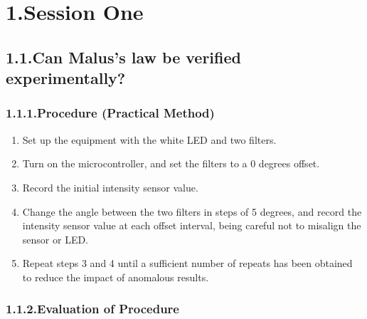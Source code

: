 \documentclass{article}
\begin{document}
\section{1.\hspace*{0.5em}Session One}\label{sec-session-one}%

\subsection{1.1.\hspace*{0.5em}Can Malus’s law be verified experimentally?}\label{sec-can-maluss-law-be-verified-experimentally}%

\subsubsection{1.1.1.\hspace*{0.5em}Procedure (Practical Method)}\label{sec-procedure-practical-method}%

\begin{enumerate}[noitemsep,topsep=\mdcompacttopsep]%

\item{}Set up the equipment with the white LED and two filters.%

\item{}Turn on the microcontroller, and set the filters to a 0 degrees offset.%

\item{}Record the initial intensity sensor value.%

\item{}Change the angle between the two filters in steps of 5 degrees, and record the intensity sensor value at each offset interval, being careful not to misalign the sensor or LED.%

\item{}Repeat steps 3 and 4 until a sufficient number of repeats has been obtained to reduce the impact of anomalous results.%
\end{enumerate}%

\subsubsection{1.1.2.\hspace*{0.5em}Evaluation of Procedure}\label{sec-evaluation-of-procedure}%
\end{document}
